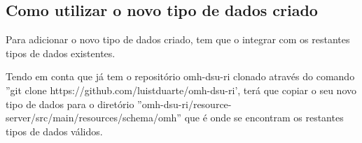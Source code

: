 \begin{enumerate}
\subsection{Como utilizar o novo tipo de dados criado}

Para adicionar o novo tipo de dados criado, tem que o integrar com os restantes tipos de dados existentes. \par Tendo em conta que já tem o repositório omh-dsu-ri clonado através do comando ''git clone https://github.com/luistduarte/omh-dsu-ri', terá que copiar o seu novo tipo de dados para o diretório ''omh-dsu-ri/resource-server/src/main/resources/schema/omh'' que é onde se encontram os restantes tipos de dados válidos.

\end{enumerate}

\cleardoublepage
